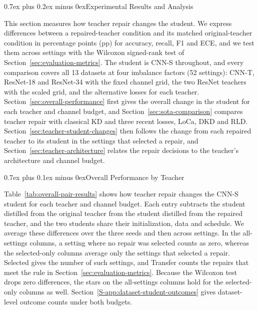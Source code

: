\documentclass[10pt,journal,compsoc]{IEEEtran}
\makeatletter
\def\section{\@startsection{section}{1}{\z@}{-3.5ex plus -0.5ex minus -1.5ex}%
{0.7ex plus 0.2ex minus 0ex}{\normalfont\sublargesize\sffamily\bfseries\scshape}}
\def\subsection{\@startsection{subsection}{2}{\z@}{-3.5ex plus -0.5ex minus -1.5ex}%
{0.7ex plus 0.1ex minus 0ex}{\normalfont\normalsize\sffamily\bfseries}}
\theoremstyle{definition}
\makeatother
\begin{document}
\FloatBarrier
\vspace{-5pt}
\section{Experimental Results and Analysis}
\label{sec:results}

This section measures how teacher repair changes the student. We
express differences between a repaired-teacher condition and its
matched original-teacher condition in percentage points (pp) for
accuracy, recall, F1 and ECE, and we test them across settings with the
Wilcoxon signed-rank test of Section~\ref{sec:evaluation-metrics}. The
student is CNN-S throughout, and every comparison covers all 13
datasets at four imbalance factors (52 settings): CNN-T, ResNet-18 and
ResNet-34 with the fixed channel grid, the two ResNet teachers with the
scaled grid, and the alternative losses for each teacher.
Section~\ref{sec:overall-performance} first gives the overall change in
the student for each teacher and channel budget, and
Section~\ref{sec:sota-comparison} compares teacher repair with
classical KD and three recent losses, LoCa, DKD and RLD.
Section~\ref{sec:teacher-student-changes} then follows the change from
each repaired teacher to its student in the settings that selected a
repair, and Section~\ref{sec:teacher-architecture} relates the repair
decisions to the teacher's architecture and channel budget.

\vspace{-5pt}
\subsection{Overall Performance by Teacher}
\label{sec:overall-performance}
\suppressfloats[t]

Table~\ref{tab:overall-pair-results} shows how teacher repair changes
the CNN-S student for each teacher and channel budget. Each entry
subtracts the student distilled from the original teacher from the
student distilled from the repaired teacher, and the two students share
their initialization, data and schedule. We average these differences
over the three seeds and then across settings. In the all-settings
columns, a setting where no repair was selected counts as zero,
whereas the selected-only columns average only the settings that
selected a repair. Selected gives the number of such settings, and
Transfer counts the repairs that meet the rule in
Section~\ref{sec:evaluation-metrics}. Because the Wilcoxon test drops
zero differences, the stars on the all-settings columns hold for the
selected-only columns as well. Section~\ref{S-app:dataset-student-outcomes}
gives dataset-level outcome counts under both budgets.
\end{document}

